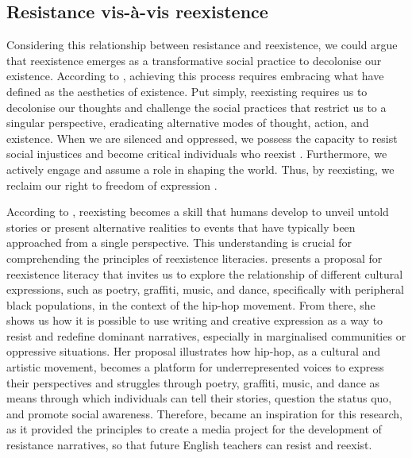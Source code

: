 \documentclass[english]{textolivre}
\begin{document}
\subsection{Resistance vis-à-vis reexistence}\label{subsec-resistancevisavis}
Considering this relationship between resistance and reexistence, we could argue that reexistence emerges as a transformative social practice to decolonise our existence. According to \textcite{alban2008,alban2017}, achieving this process requires embracing what \textcite{giroux1983,foucault1991} have defined as the aesthetics of existence. Put simply, reexisting requires us to decolonise our thoughts and challenge the social practices that restrict us to a singular perspective, eradicating alternative modes of thought, action, and existence. When we are silenced and oppressed, we possess the capacity to resist social injustices and become critical individuals who reexist \cite{silva-souza2009letramentos,silva-souza2011letramentos}. Furthermore, we actively engage and assume a role in shaping the world. Thus, by reexisting, we reclaim our right to freedom of expression \cite{alban2013,freire1970}.

According to \textcite{silva-souza2011letramentos}, reexisting becomes a skill that humans develop to unveil untold stories or present alternative realities to events that have typically been approached from a single perspective. This understanding is crucial for comprehending the principles of reexistence literacies. \textcite{silva-souza2009letramentos,silva-souza2011letramentos} presents a proposal for reexistence literacy that invites us to explore the relationship of different cultural expressions, such as poetry, graffiti, music, and dance, specifically with peripheral black populations, in the context of the hip-hop movement. From there, she shows us how it is possible to use writing and creative expression as a way to resist and redefine dominant narratives, especially in marginalised communities or oppressive situations. Her proposal illustrates how hip-hop, as a cultural and artistic movement, becomes a platform for underrepresented voices to express their perspectives and struggles through poetry, graffiti, music, and dance as means through which individuals can tell their stories, question the status quo, and promote social awareness. Therefore, \textcite{silva-souza2011letramentos} became an inspiration for this research, as it provided the principles to create a media project for the development of resistance narratives, so that future English teachers can resist and reexist.
\end{document}

